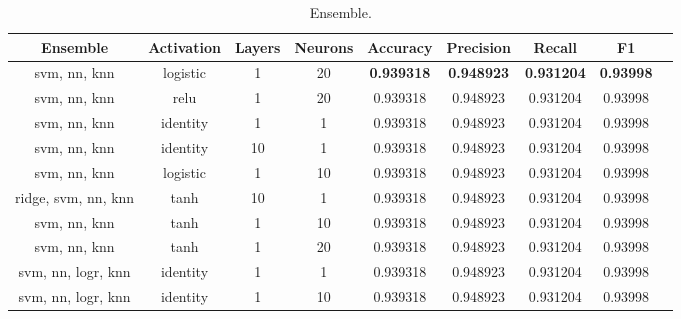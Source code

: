 \begin{appendices}
\begin{table}[ht]
\begin{subtable}{\textwidth}
\begin{adjustbox}{minipage=15cm, center}
\begin{tabular*}{\textwidth}{c @{\extracolsep{\fill}} cccccccc}
\toprule
Ensemble     & Activation & Layers        &  Neurons &  Accuracy &  Precision &    Recall &  F1 \\
\midrule
svm, nn, knn &   logistic & 1             &       20 &  \textbf{0.939318} &   \textbf{0.948923} &  \textbf{0.931204} &  \textbf{0.93998} \\
svm, nn, knn &       relu & 1             &       20 &  0.939318 &   0.948923 &  0.931204 &  0.93998 \\
svm, nn, knn &   identity & 1             &        1 &  0.939318 &   0.948923 &  0.931204 &  0.93998 \\
svm, nn, knn &   identity & 10            &        1 &  0.939318 &   0.948923 &  0.931204 &  0.93998 \\
svm, nn, knn &   logistic & 1             &       10 &  0.939318 &   0.948923 &  0.931204 &  0.93998 \\
ridge, svm, nn, knn & tanh & 10           &        1 &  0.939318 &   0.948923 &  0.931204 &  0.93998 \\
svm, nn, knn &       tanh & 1             &       10 &  0.939318 &   0.948923 &  0.931204 &  0.93998 \\
svm, nn, knn &       tanh & 1             &       20 &  0.939318 &   0.948923 &  0.931204 &  0.93998 \\
svm, nn, logr, knn & identity & 1         &        1 &  0.939318 &   0.948923 &  0.931204 &  0.93998 \\
svm, nn, logr, knn & identity & 1         &       10 &  0.939318 &   0.948923 &  0.931204 &  0.93998 \\
\bottomrule

\end{tabular*}
\caption{Ensemble.}
\label{tab:Ensemble}
\end{adjustbox}
\end{subtable}



\end{table}
\end{appendices}
